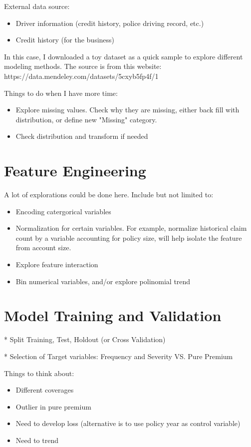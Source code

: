 \documentclass{article}
\begin{document}
External data source:
\begin{itemize}
    \item Driver information (credit history, police driving record, etc.)
    \item Credit history (for the business)
\end{itemize}

In this case, I downloaded a toy dataset as a quick sample to explore different modeling methods. The source is from this website: https://data.mendeley.com/datasets/5cxyb5fp4f/1 

Things to do when I have more time:
\begin{itemize}
    \item Explore missing values. Check why they are missing, either back fill with distribution, or define new "Missing" category.
    \item Check distribution and transform if needed
\end{itemize}

\section{Feature Engineering}

A lot of explorations could be done here. Include but not limited to:
\begin{itemize}
    \item Encoding catergorical variables
    \item Normalization for certain variables. For example, normalize historical claim count by a variable accounting for policy size, will help isolate the feature from account size.
    \item Explore feature interaction
    \item Bin numerical variables, and/or explore polinomial trend
\end{itemize}


\section{Model Training and Validation}

* Split Training, Test, Holdout (or Cross Validation)

* Selection of Target variables: Frequency and Severity VS. Pure Premium


Things to think about:
\begin{itemize}
    \item Different coverages
    \item Outlier in pure premium
    \item Need to develop loss (alternative is to use policy year as control variable)
    \item Need to trend
\end{itemize}
\end{document}
